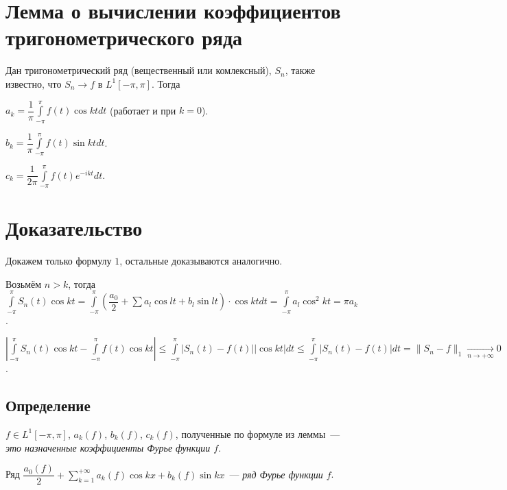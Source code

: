 \documentclass{article}
\begin{document}
    \newpage
    
    \section{Лемма о вычислении коэффициентов тригонометрического ряда}
    
        Дан тригонометрический ряд (вещественный или комлексный), $S_n$, также известно, что $S_n \rightarrow f$ в $L^1 [-\pi, \pi]$. Тогда
        
        $a_k = \dfrac{1}{\pi} \int\limits^{\pi}_{-\pi} f(t) \cos kt dt$ (работает и при $k = 0$).
        
        $b_k = \dfrac{1}{\pi} \int\limits^{\pi}_{-\pi} f(t) \sin kt dt$.
        
        $c_k = \dfrac{1}{2 \pi} \int\limits^{\pi}_{-\pi} f(t) e^{-ikt} dt$.

        \section{Доказательство}
        
            Докажем только формулу $1$, остальные доказываются аналогично.
            
            Возьмём $n > k$, тогда $\int\limits_{-\pi}^{\pi} S_n(t) \cos {kt} = \int\limits^{\pi}_{-\pi} \left( \dfrac{a_0}{2} + \sum a_l \cos {lt} + b_l \sin {lt} \right) \cdot \cos {kt} dt = \int\limits^{\pi}_{-\pi} a_l \cos^2 {kt} = \pi a_k$.
            
            $\left| \int\limits^{\pi}_{-\pi} S_n(t) \cos {kt} - \int\limits^{\pi}_{-\pi} f(t) \cos {kt} \right| \leqslant \int\limits^{\pi}_{-\pi} \left| S_n(t) - f(t) \right| \left| \cos {kt} \right| dt \leqslant \int\limits^{\pi}_{-\pi} \left| S_n(t) - f(t) \right| dt = \| S_n - f \|_1 \xrightarrow[n \rightarrow +\infty]{} 0$.
      
    \newpage
    
    \subsection{Определение}
    
        $f \in L^1 [-\pi, \pi]$, $a_k(f)$, $b_k(f)$, $c_k(f)$, полученные по формуле из леммы~--- \textit{это назначенные коэффициенты Фурье функции $f$}.
        
        Ряд $\dfrac{a_0(f)}{2} + \sum\limits_{k = 1}^{+\infty} a_k(f) \cos {kx} + b_k(f) \sin {kx}$~--- \textit{ряд Фурье функции $f$}.
        
\end{document}
